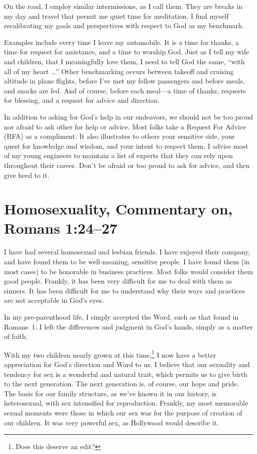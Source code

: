 \documentclass[12pt]{memoir}
\begin{document}
On the road, I employ similar intermissions, as I call them.
They are breaks in my day and travel that permit me quiet time for meditation. I find myself recalibrating my goals
and perspectives with respect to God as my benchmark.

Examples include every time I leave my automobile. It is a time for thanks, a time for request for assistance, and a time to worship God. Just
as I tell my wife and children, that I meaningfully love them,
I need to tell God the same, ``with all of my heart \dots'' Other
benchmarking occurs between takeoff and cruising altitude in plane
flights, before I've met my fellow passengers and before meals, and snacks are fed. And of course, before each meal---a time of thanks, requests for blessing, and a request for advice and direction. 

In addition to asking for God's help in our endeavors, we should not
be too proud nor afraid to ask other for help or advice. Most folks
take a Request For Advice (RFA) as a compliment. It also illustrates
to others your sensitive side, your quest for knowledge and wisdom,
and your intent to respect them. I advise most of my young engineers
to maintain a list of experts that they can rely upon throughout their career. Don't be afraid or too proud to ask for advice, and
then give heed to it.

\section[Homosexuality, Commentary on]{Homosexuality, Commentary on, Romans 1:24--27}

I have had several homosexual and lesbian friends. I have enjoyed
their company, and have found them to be well-meaning, sensitive people.
I have found them (in most cases) to be honorable in business practices.
Most folks would consider them good people. Frankly, it has been very
difficult for me to deal with them as sinners. It has been difficult
for me to understand why their ways and practices are not acceptable
in God's eyes. 

In my pre-parenthood life, I simply accepted the Word, such as that found in Romans~1. I left the differences and judgment in God's hands, simply as a matter of faith. 

With my two children nearly grown at this time,\footnote{Does this deserve an edit?} I now have a better
appreciation for God's direction and Word to us. I believe that our
sexuality and tendency for sex is a wonderful and natural trait,
which permits us to give birth to the next generation. The next generation is, of course, our hope and pride. The basis for our family structure, as we've known it in our history, is heterosexual, with sex intensified
for reproduction. Frankly, my most memorable sexual moments were those
in which our sex was for the purpose of creation of our children.
It was very powerful sex, as Hollywood would describe it. 
\end{document}
